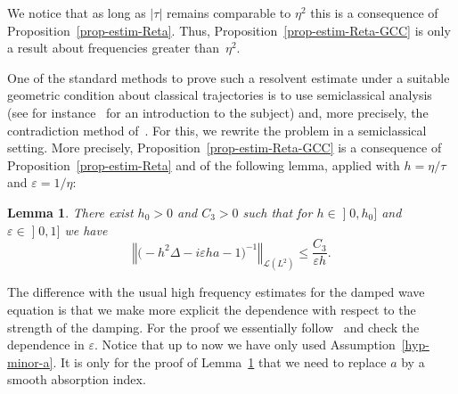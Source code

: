 \documentclass[10pt]{amsart}
\newtheorem{lemm}[theo]{Lemma}\newtheorem{prop}[theo]{Proposition}\newtheorem{coro}[theo]{Corollary}\newtheorem{conj}[theo]{Conjecture}
\theoremstyle{definition}\newtheorem{defi}[theo]{Definition}\newtheorem{rema}[theo]{Remark}\newtheorem{exam}[theo]{Example}\newtheorem{exem}[theo]{Example}\newtheorem{nota}[theo]{Notation}
\newcommand{\abs}[1]{\left\vert #1\right\vert}
\newcommand{\nr}[1]{\left\Vert #1\right\Vert}
\renewcommand{\leq}{\leqslant}
\newcommand{\inv}{^{-1}}
\newcommand{\1}{\mathds 1}
\newcommand{\D}{\Delta}
\newcommand{\e}{\varepsilon}
\renewcommand{\t}{\tau}
\newcommand{\Lc}{{\mathcal L}}
\begin{document}
We notice that as long as $\abs \t$ remains comparable to $\eta^2$ this is a consequence of Proposition~\ref{prop-estim-Reta}. Thus, Proposition~\ref{prop-estim-Reta-GCC} is only a result about frequencies greater than~$\eta^2$.

One of the standard methods to prove such a resolvent estimate under a suitable geometric condition about classical trajectories is to use semiclassical analysis (see for instance~\cite{zworski} for an introduction to the subject) and, more precisely, the contradiction method of~\cite{Lebeau96}. For this, we rewrite the problem in a semiclassical setting. More precisely, Proposition~\ref{prop-estim-Reta-GCC} is a consequence of Proposition~\ref{prop-estim-Reta} and of the following lemma, applied with $h = \eta / \t$ and $\e = 1/\eta$:

\begin{lemm}\label{lem-high-freq}
There exist $h_0 > 0$ and $C_3 > 0$ such that for $h \in\mathopen{]}0,h_0]$ and $\e \in\mathopen{]}0,1]$ we have
\[
\nr{\big(-h^2 \D - i \e h a - 1 \big) \inv}_{\Lc(L^2)} \leq \frac {C_3} {\e h}.
\]
\end{lemm}

The difference with the usual high frequency estimates for the damped wave equation is that we make more explicit the dependence with respect to the strength of the damping. For the proof we essentially follow~\cite{BurqJo} and check the dependence in $\e$. Notice that up to now we have only used Assumption~\eqref{hyp-minor-a}. It is only for the proof of Lemma~\ref{lem-high-freq} that we need to replace $a$ by a smooth absorption index.
\end{document}
